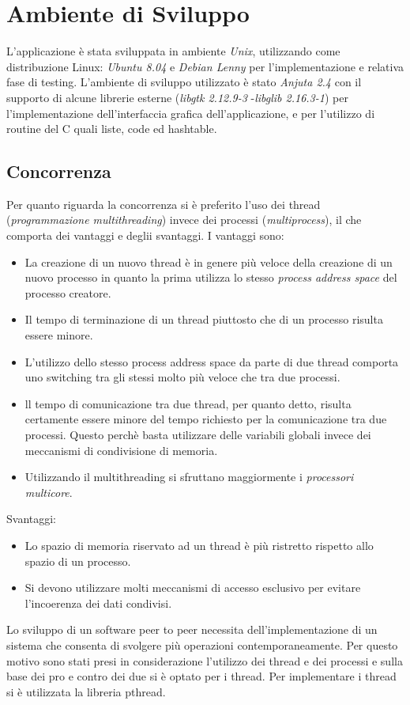 \chapter{Ambiente di Sviluppo}
L'applicazione è stata sviluppata in ambiente \textit{Unix}, utilizzando come distribuzione Linux: \textit{Ubuntu 8.04} e \textit{Debian Lenny} per l'implementazione e relativa fase di testing.
L'ambiente di sviluppo utilizzato è stato \textit{Anjuta 2.4} con il supporto di alcune librerie esterne (\textit{libgtk 2.12.9-3} -\textit{libglib 2.16.3-1}) per l'implementazione dell'interfaccia grafica dell'applicazione, e per l'utilizzo di routine del C quali liste, code ed hashtable.
\section{Concorrenza}
Per quanto riguarda la concorrenza si è preferito l'uso dei thread (\textit{programmazione multithreading}) invece dei processi (\textit{multiprocess}), il che comporta dei vantaggi e deglii svantaggi. I vantaggi sono: 
\begin{itemize}
\item La creazione di un nuovo thread è in genere più veloce della creazione di un nuovo processo in quanto la prima utilizza lo stesso \textit{process address space}  del processo creatore. 
\item Il tempo di terminazione di un thread piuttosto che di un processo risulta essere minore. 
\item L'utilizzo dello stesso process address space da parte di due thread comporta uno switching tra gli stessi molto più veloce che tra due processi. 
\item ll tempo di comunicazione tra due thread, per quanto detto, risulta certamente essere minore del tempo richiesto per la comunicazione tra due processi. Questo perchè basta utilizzare delle variabili globali invece dei meccanismi di condivisione di memoria.
\item Utilizzando il multithreading si sfruttano maggiormente i \textit{processori multicore}.
\end{itemize}
Svantaggi:
\begin{itemize}
\item Lo spazio di memoria riservato ad un thread è più ristretto rispetto allo spazio di un processo.
\item Si devono utilizzare molti meccanismi di accesso esclusivo per evitare l'incoerenza dei dati condivisi.
\end{itemize}
Lo sviluppo di un software peer to peer necessita dell’implementazione di un sistema che consenta di svolgere più operazioni contemporaneamente. Per questo motivo sono stati presi in considerazione l’utilizzo dei thread e dei processi e sulla base dei pro e contro dei due si è optato per i thread. Per implementare i thread si è utilizzata la libreria pthread.
